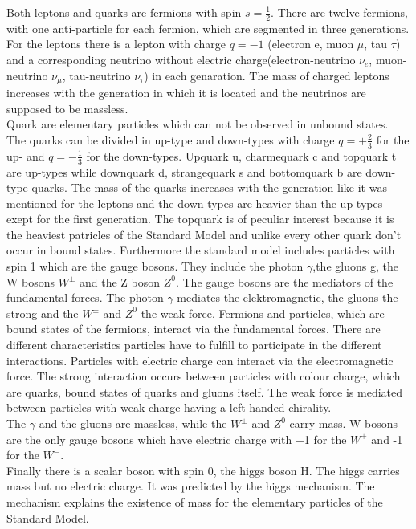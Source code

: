 Both leptons and quarks are fermions with spin $s= \frac{1}{2}$. 
There are twelve fermions, with one anti-particle for each fermion, which are segmented in three generations.     
For the leptons there is a lepton with charge $q = -1$ (electron e, muon $\mu$, tau $\tau$) and a corresponding neutrino without electric charge(electron-neutrino $\nu_{e}$, muon-neutrino $\nu_{\mu}$, tau-neutrino $\nu_{\tau}$) in each genaration.
The mass of charged leptons increases with the generation in which it is located and the neutrinos are supposed to be massless.\\
Quark are elementary particles which can not be observed in unbound states.
The quarks can be divided in up-type and down-types with charge $q = +\frac{2}{3}$ for the up- and $q = -\frac{1}{3}$ for the down-types.
Upquark u, charmequark c and topquark t are up-types while downquark d, strangequark s and bottomquark b are down-type quarks. 
The mass of the quarks increases with the generation like it was mentioned for the leptons and the down-types are heavier than the up-types exept for the first generation.
The topquark is of peculiar interest because it is the heaviest patricles of the Standard Model and unlike every other quark don't occur in bound states.
Furthermore the standard model includes particles with spin 1 which are the gauge bosons.
They include the photon $\gamma$,the gluons g, the W bosons $W^{\pm}$ and the Z boson $Z^{0}$.
The gauge bosons are the mediators of the fundamental forces. 
The photon $\gamma$ mediates the elektromagnetic, the gluons the strong  and the $W^{\pm}$ and $Z^{0}$ the weak force.  
Fermions and particles, which are bound states of the fermions, interact via the fundamental forces.
There are different characteristics particles have to fulfill to participate in the different interactions.
Particles with electric charge can interact via the electromagnetic force.
The strong interaction occurs between particles with colour charge, which are quarks, bound states of quarks and gluons itself.
The weak force is mediated between particles with weak charge having a left-handed chirality.\\
The $\gamma$ and the gluons are massless, while the $W^{\pm}$ and $Z^{0}$ carry mass. 
W bosons are the only gauge bosons which have electric charge with +1 for the $W^{+}$ and -1 for the $W^{-}$.\\
Finally there is a scalar boson with spin 0, the higgs boson H.
The higgs carries mass but no electric charge.
It was predicted  by the higgs mechanism.
The mechanism explains the existence of mass for the elementary particles of the Standard Model.




